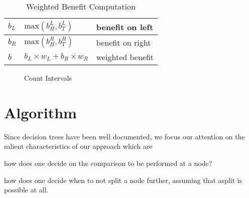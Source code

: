 \begin{table}
\begin{tabular}{|l|l|l|}
\(b_L\) & \( \mathrm{max}(b_H^L, b_T^L)\) & benefit on left \\ \hline
\(b_R\) & \( \mathrm{max}(b_H^R, b_T^R)\) & benefit on right \\ \hline
\hline

\(b\) &  \(b_L \times w_L + b_R \times w_R\) & weighted benefit \\ \hline
\end{tabular}
\label{algo_weighted_benefit}
\caption{Weighted Benefit Computation}
\end{table}
\begin{figure}
\centering
{}
\label{count_intervals}
\caption{Count Intervals}
\end{figure}

\section{Algorithm}

Since decision trees have been well documented, we focus our attention on the
salient characteristics of our approach which are
\be
\item how does one decide on the comparison to be performed at a node?
\item how does one decide when to not split a node further, assuming that asplit
is possible at all.
\ee

